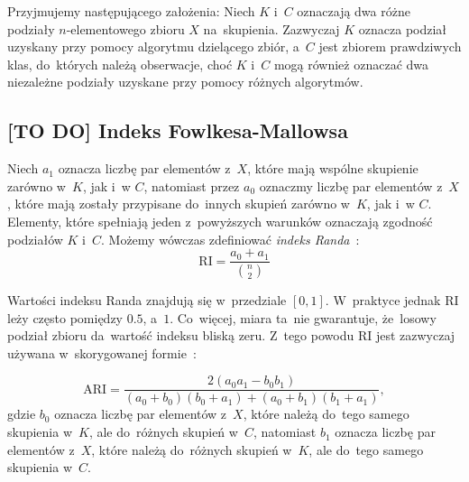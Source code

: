 \documentclass{praca1}
\begin{document}
Przyjmujemy następującego założenia: Niech $K$ i~$C$ oznaczają dwa różne podziały $n$-elementowego zbioru $X$ na~skupienia. Zazwyczaj $K$ oznacza podział uzyskany przy pomocy algorytmu dzielącego zbiór, a~$C$ jest zbiorem prawdziwych klas, do~których należą obserwacje, choć $K$ i~$C$ mogą również oznaczać dwa niezależne podziały uzyskane przy pomocy różnych algorytmów.

\subsection{[TO DO] Indeks Fowlkesa-Mallowsa}

Niech $a_1$ oznacza liczbę par elementów z~$X$, które mają wspólne skupienie zarówno w~$K$, jak i~w $C$, natomiast przez $a_0$ oznaczmy liczbę par elementów z~$X$, które mają zostały przypisane do~innych skupień zarówno w~$K$, jak i~w $C$. Elementy, które spełniają jeden z~powyższych warunków oznaczają zgodność podziałów $K$ i~$C$. Możemy wówczas zdefiniować \emph{indeks Randa}~\cite{Rand1971:objective}:
\begin{equation}
\textrm{RI} = \frac{a_0+a_1}{{n \choose 2} }
\end{equation}

Wartości indeksu Randa znajdują się w~przedziale $[0,1]$. W~praktyce jednak $\textrm{RI}$ leży często pomiędzy $0.5$, a~$1$. Co~więcej, miara ta~nie gwarantuje, że~losowy podział zbioru da~wartość indeksu bliską zeru. Z~tego powodu $\textrm{RI}$ jest zazwyczaj używana w~skorygowanej formie~\cite{Lawrence1985:comparing}:

\begin{equation}
\textrm{ARI} = \frac{2 (a_0 a_1 - b_0 b_1) }{(a_0 + b_0)(b_0 + a_1) + (a_0 + b_1)(b_1 + a_1)},
\end{equation}
gdzie $b_0$ oznacza liczbę par elementów z~$X$, które należą do~tego samego skupienia w~$K$, ale do~różnych skupień w~$C$, natomiast $b_1$ oznacza liczbę par elementów z~$X$, które należą do~różnych skupień w~$K$, ale do~tego samego skupienia w~$C$.



\end{document}
